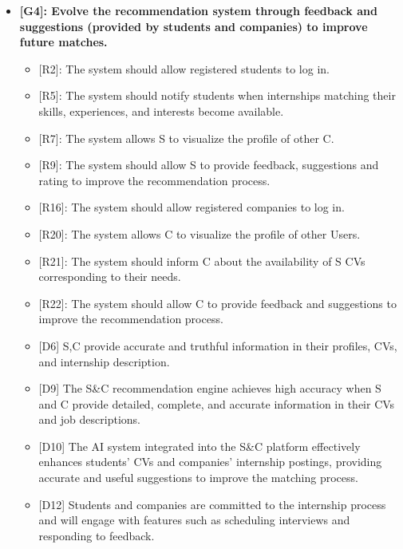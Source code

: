 \begin{itemize}
\item
  \textbf{{[}G4{]}: Evolve the recommendation system through feedback
  and suggestions (provided by students and companies) to improve future
  matches.}

  \begin{itemize}
  \item
    {[}R2{]}: The system should allow registered students to log in.
  \item
    {[}R5{]}: The system should notify students when internships
    matching their skills, experiences, and interests become available.
  \item
    {[}R7{]}: The system allows S to visualize the profile of other C.~
  \item
    {[}R9{]}: The system should allow S to provide feedback, suggestions
    and rating to improve the recommendation process.
  \item
    {[}R16{]}: The system should allow registered companies to log in.
  \item
    {[}R20{]}: The system allows C to visualize the profile of other
    Users.
  \item
    {[}R21{]}: The system should inform C about the availability of S
    CVs corresponding to their needs.
  \item
    {[}R22{]}: The system should allow C to provide feedback and
    suggestions to improve the recommendation process.
  \item
    {[}D6{]} S,C provide accurate and truthful information in their
    profiles, CVs, and internship description.
  \item
    {[}D9{]} The S\&C recommendation engine achieves high accuracy when
    S and C provide detailed, complete, and accurate information in
    their CVs and job descriptions.
  \item
    {[}D10{]} The AI system integrated into the S\&C platform
    effectively enhances students' CVs and
    companies' internship postings, providing accurate
    and useful suggestions to improve the matching process.
  \item
    {[}D12{]} Students and companies are committed to the internship
    process and will engage with features such as scheduling interviews
    and responding to feedback.
  \end{itemize}
\end{itemize}

